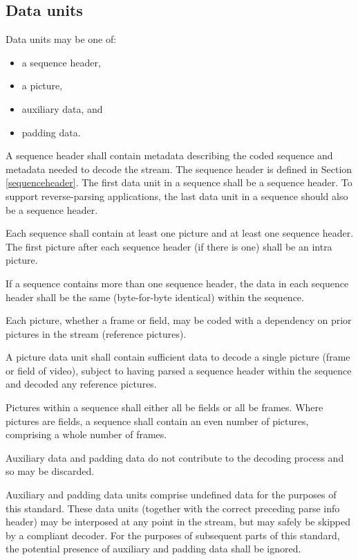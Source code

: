 \subsection{Data units}

Data units may be one of:
\begin{itemize}
\item a sequence header, 
\item a picture, 
\item auxiliary data, and
\item padding data. 
\end{itemize}

A sequence header shall contain metadata describing the coded sequence 
and metadata needed to decode the stream. The sequence header is defined 
in Section \ref{sequenceheader}. The first data unit in a sequence shall be a 
sequence header. To support reverse-parsing applications, the last data unit in 
a sequence should also be a sequence header.

Each sequence shall contain at least one picture and at least one sequence header.
The first picture after each sequence header (if there is one) shall be an intra picture.

If a sequence contains more than one sequence header, the data 
in each sequence header shall be the same (byte-for-byte identical) within the sequence.

Each picture, whether a frame or field, may be coded with a dependency 
on prior pictures in the stream (reference pictures).

A picture data unit shall contain sufficient data to decode a single picture 
(frame or field of video), subject to having parsed a sequence header within 
the sequence and decoded any reference pictures.

Pictures within a sequence shall either all be fields or all be frames. 
Where pictures are fields, a sequence shall contain an even number of pictures, 
comprising a whole number of frames.

Auxiliary data and padding data do not contribute to the decoding 
process and so may be discarded. 


Auxiliary and padding data units comprise undefined data for the purposes
 of this standard. These data units (together with the correct preceding 
parse info header) may be interposed at any point in the stream, but 
may safely be skipped by a compliant decoder. For the purposes of 
subsequent parts of this standard, the potential presence of auxiliary 
and padding data shall be ignored.

